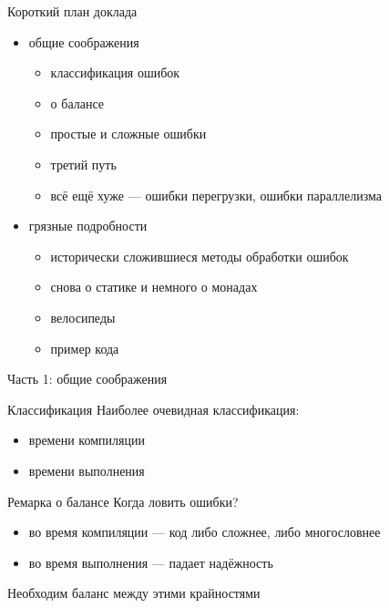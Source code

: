 \documentclass[10pt]{beamer}
\begin{document}
\begin{frame}{Короткий план доклада}
  \begin{itemize}
  \item общие соображения
    \begin{itemize}
    \item классификация ошибок
    \item о балансе
    \item простые и сложные ошибки
    \item третий путь
    \item всё ещё хуже — ошибки перегрузки, ошибки параллелизма
    \end{itemize}
  \item грязные подробности
    \begin{itemize}
    \item исторически сложившиеся методы обработки ошибок
    \item снова о статике и немного о монадах
    \item велосипеды
    \item пример кода
    \end{itemize}
  \end{itemize}
\end{frame}

\begin{frame}{}
  \begin{center}
    \huge Часть 1: общие соображения
  \end{center}
\end{frame}

\begin{frame}{Классификация}
  Наиболее очевидная классификация:
  \begin{itemize}
  \item времени компиляции
  \item времени выполнения
  \end{itemize}
\end{frame}

\begin{frame}{Ремарка о балансе}
  Когда ловить ошибки?
  \begin{itemize}
  \item во время компиляции — код либо сложнее, либо многословнее
  \item во время выполнения — падает надёжность
  \end{itemize}
  Необходим баланс между этими крайностями
\end{frame}
\end{document}
